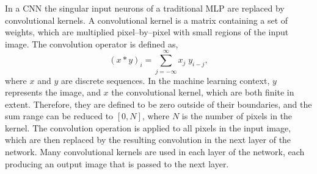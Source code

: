 In a CNN the singular input neurons of a traditional MLP are replaced by
convolutional kernels. A convolutional kernel is a matrix containing a set of 
weights, which are multiplied pixel--by--pixel with small regions of the input 
image. The convolution operator is defined as, 
\begin{equation*}
	\left( x * y \right)_i = \sum_{j = - \infty}^{\infty} x_j \; y_{i-j},
\end{equation*}
where $x$ and $y$ are discrete sequences. In the machine learning context, $y$
represents the image, and $x$ the convolutional kernel, which are both finite in
extent. Therefore, they are defined to be zero outside of their boundaries, and
the sum range can be reduced to $\left[0, N\right]$, where $N$ is the number 
of pixels in the kernel. The convolution operation is applied to all pixels in 
the input image, which are then replaced by the resulting convolution in the 
next layer of the network. Many convolutional kernels are used in each layer 
of the network, each producing an output image that is passed to the next 
layer. 

